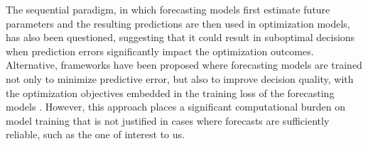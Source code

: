 \documentclass[opre,sglanonrev,11pt]{informs4}
\begin{document}
The sequential paradigm, in which forecasting models first estimate future parameters and the resulting predictions are then used in optimization models, has also been questioned, suggesting that it could result in suboptimal decisions when prediction errors significantly impact the optimization outcomes. Alternative, frameworks have been proposed where forecasting models are trained not only to minimize predictive error, but also to improve decision quality, with the optimization objectives embedded in the training loss of the forecasting models \citep{DAK17,WDT19}. However, this approach places a significant computational burden on model training that is not justified in cases where forecasts are sufficiently reliable, such as the one of interest to us.

\end{document}

